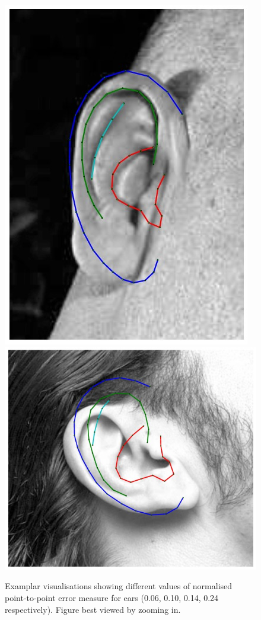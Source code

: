 \begin{figure}
    \hfill
    \includegraphics[height=\flowh]{resources/Ear_Deformable_Model/ear_14}
    \hfill
    \includegraphics[height=\flowh]{resources/Ear_Deformable_Model/ear_24}
\caption{Examplar visualisations showing different values of normalised point-to-point error measure for ears (0.06, 0.10, 0.14, 0.24 respectively). Figure best viewed by zooming in.}
\label{fig:ear_error}
\end{figure}


